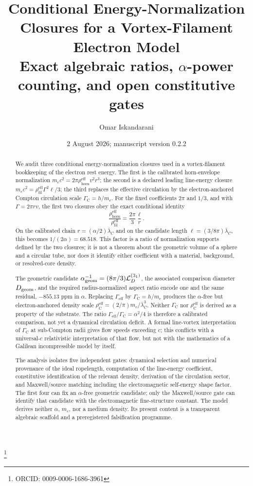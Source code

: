 \documentclass[aps,pre,preprint,notitlepage,nofootinbib,superscriptaddress]{revtex4-2}
\newcommand{\rhohorn}{\rho_{\mathrm{horn}}^{\mathrm{eff}}}
\newcommand{\rhofil}{\rho_{\mathrm{fil}}^{\mathrm{eff}}}
\newcommand{\rhoCeff}{\rho_{\mathrm C}^{\mathrm{eff}}}
\newcommand{\Gammaeff}{\Gamma_{\mathrm{eff}}}
\newcommand{\GammaC}{\Gamma_{\mathrm C}}
\begin{document}
\title{\texorpdfstring{Conditional Energy-Normalization Closures for a Vortex-Filament Electron Model\\\large Exact algebraic ratios, \(\alpha\)-power counting, and open constitutive gates}{Conditional Energy-Normalization Closures for a Vortex-Filament Electron Model}}

\author{Omar Iskandarani}
\thanks{ORCID: 0009-0006-1686-3961}
\date{2 August 2026; manuscript version 0.2.2}

\begin{abstract}
We audit three conditional energy-normalization closures used in a vortex-filament bookkeeping of the electron rest energy.  The first is the calibrated horn-envelope normalization
\(m_ec^2=2\pi\rhohorn v^2r^3\); the second is a declared leading line-energy closure
\(m_ec^2=\rhofil\Gamma^2\ell/3\); the third replaces the effective circulation by the electron-anchored Compton circulation scale \(\GammaC=h/m_e\).
For the fixed coefficients \(2\pi\) and \(1/3\), and with \(\Gamma=2\pi rv\), the first two closures obey the exact conditional identity
\[
\frac{\rhohorn}{\rhofil}
=\frac{2\pi}{3}\frac{\ell}{r}.
\]
On the calibrated chain \(r=(\alpha/2)\bar\lambda_C\) and on the candidate length
\(\ell=(3/8\pi)\bar\lambda_C\), this becomes \(1/(2\alpha)=68.518\).
This factor is a ratio of normalization supports defined by the two closures; it is not a theorem about the geometric volume of a sphere and a circular tube, nor does it identify either coefficient with a material, background, or resolved-core density.

The geometric candidate
\(\alpha_{\rm geom}^{-1}=(8\pi/3)\mathcal L_D^{(3_1)}\), the associated comparison diameter \(D_{\rm geom}\), and the required radius-normalized aspect ratio encode one and the same residual, \(-855.13\) ppm in \(\alpha\).
Replacing \(\Gammaeff\) by \(\GammaC=h/m_e\) produces the \(\alpha\)-free but electron-anchored density scale
\(\rhoCeff=(2/\pi)m_e/\bar\lambda_C^3\).
Neither \(\GammaC\) nor \(\rhoCeff\) is derived as a property of the substrate.
The ratio \(\Gammaeff/\GammaC=\alpha^2/4\) is therefore a calibrated comparison, not yet a dynamical circulation deficit.
A formal line-vortex interpretation of \(\GammaC\) at sub-Compton radii gives flow speeds exceeding \(c\); this conflicts with a universal-\(c\) relativistic interpretation of that flow, but not with the mathematics of a Galilean incompressible model by itself.

The analysis isolates five independent gates: dynamical selection and numerical provenance of the ideal ropelength, computation of the line-energy coefficient, constitutive identification of the relevant density, derivation of the circulation sector, and Maxwell/source matching including the electromagnetic self-energy shape factor.  The first four can fix an \(\alpha\)-free geometric candidate; only the Maxwell/source gate can identify that candidate with the electromagnetic fine-structure constant.
The model derives neither \(\alpha\), \(m_e\), nor a medium density.
Its present content is a transparent algebraic scaffold and a preregistered falsification programme.
\end{abstract}
\end{document}
